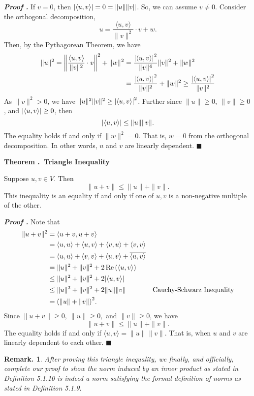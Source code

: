 \documentclass[11pt, letterpaper]{article}
\newcounter{index}[subsection]
\newenvironment*{thm}[1]{\begin{tcolorbox}\par\noindent\textbf{Theorem \thesubsection.\stepcounter{index}\theindex\ #1} \par}{\par\end{tcolorbox}}
\newcounter{nprf}[subsection]
\newenvironment*{prf}{\par\indent\textbf{\textit{Proof \stepcounter{nprf}\thenprf.}}}{\hfill$\blacksquare$\par}
\newtheorem*{rmk}{Remark.}
\begin{document}
\begin{prf}
	If $v=0$, then $\qty|\langle u,v\rangle|=0=\|u\|\|v\|$. So, we can assume $v\neq0$. Consider the orthogonal decomposition, \[u=\dfrac{\langle u,v\rangle}{\|v\|^2}\cdot v+w.\]	Then, by the Pythagorean Theorem, we have \[\begin{aligned}\|u\|^2=\left\|\dfrac{\langle u,v\rangle}{\|v\|^2}\cdot v\right\|^2+\|w\|^2&=\dfrac{\qty|\langle u,v\rangle|^2}{\|v\|^4}\|v\|^2+\|w\|^2\\&=\dfrac{\qty|\langle u,v\rangle|^2}{\|v\|^2}+\|w\|^2\geq\dfrac{\qty|\langle u,v\rangle|^2}{\|v\|^2}\end{aligned}\] As $\|v\|^2>0$, we have $\|u\|^2\|v\|^2\geq\qty|\langle u,v\rangle|^2$. Further since $\|u\|\geq0,\ \|v\|\geq0$, and $\qty|\langle u,v\rangle|\geq0$, then \[\qty|\langle u,v\rangle|\leq\|u\|\|v\|.\] The equality holds if and only if $\|w\|^2=0$. That is, $w=0$ from the orthogonal decomposition. In other words, $u$ and $v$ are linearly dependent. 
\end{prf}
\begin{thm}{Triangle Inequality}
		Suppose $u,v\in V$. Then \[\|u+v\|\leq\|u\|+\|v\|.\] This inequality is an equality if and only if one of $u,v$ is a non-negative multiple of the other. 
\end{thm}
\begin{prf}
	Note that \[\begin{aligned}\|u+v\|^2&=\langle u+v,u+v\rangle\\&=\langle u,u\rangle+\langle u,v\rangle+\langle v,u\rangle+\langle v,v\rangle\\&=\langle u,u\rangle+\langle v,v\rangle+\langle u,v\rangle+\overline{\langle u,v\rangle}\\&=\|u\|^2+\|v\|^2+2\Re\qty(\langle u,v\rangle)\\&\leq\|u\|^2+\|v\|^2+2\qty|\langle u,v\rangle|\\&\leq\|u\|^2+\|v\|^2+2\|u\|\|v\|&\text{Cauchy-Schwarz Inequality}\\&=\qty(\|u\|+\|v\|)^2.\end{aligned}\] Since $\|u+v\|\geq0,\ \|u\|\geq0,$ and $\|v\|\geq0$, we have \[\|u+v\|\leq\|u\|+\|v\|.\] The equality holds if and only if $\langle u,v\rangle=\|u\|\|v\|$. That is, when $u$ and $v$ are linearly dependent to each other. 
\end{prf}
\begin{rmk}
	After proving this triangle inequality, we finally, and officially, complete our proof to show the norm induced by an inner product as stated in Definition 5.1.10 is indeed a norm satisfying the formal definition of norms as stated in Definition 5.1.9.	
\end{rmk}
\end{document}

